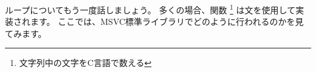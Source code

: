 ﻿ループについてもう一度話しましょう。 多くの場合、関数
\footnote{文字列中の文字をC言語で数える}
は文を使用して実装されます。 
ここでは、MSVC標準ライブラリでどのように行われるのかを見てみます。
